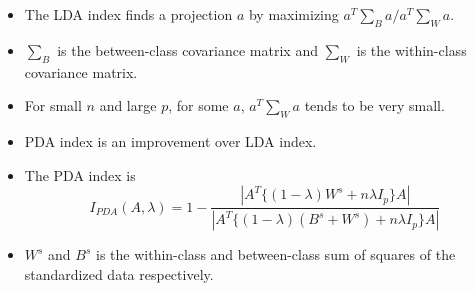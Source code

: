 \documentclass{beamer}
\begin{document}
\begin{frame}
\begin{itemize}
\item The LDA index finds a projection $a$ by maximizing $a^T\sum_Ba/a^T\sum_Wa$.
\item $\sum_B$ is the between-class covariance matrix and $\sum_W$ is the within-class covariance matrix.
\item For small $n$ and large $p$, for some $a$, $a^T\sum_Wa$ tends to be very small.
\item PDA index is an improvement over LDA index.
\item The PDA index is
$$I_{PDA}(A, \lambda) = 1 - \frac{|A^T\{(1 - \lambda)W^s + n\lambda I_p\}A|}{|A^T\{(1 - \lambda)(B^s + W^s) + n\lambda I_p\}A|}$$
\item $W^s$ and $B^s$ is the within-class and between-class sum of squares of the standardized data respectively.
\end{itemize}
\end{frame}
\end{document}
